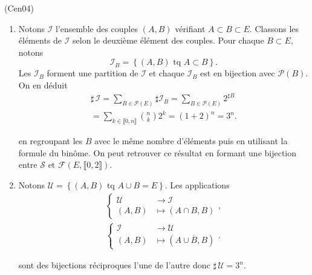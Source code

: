 \begin{tiny}(Cen04)\end{tiny} 
\begin{enumerate}
  \item Notons $\mathcal{I}$ l'ensemble des couples $(A,B)$ vérifiant $A\subset B \subset E$.\newline
Classons les éléments de $\mathcal{I}$ selon le deuxième élément des couples. Pour chaque $B \subset E$, notons
\[
  \mathcal{I}_B =
  \left\lbrace (A,B) \text{ tq } A \subset B \right\rbrace.
\]
Les $\mathcal{I}_B$ forment une partition de $\mathcal{I}$ et chaque $\mathcal{I}_B$ est en bijection avec $\mathcal{P}(B)$. On en déduit
\begin{multline*}
\sharp\, \mathcal{I} =  \sum_{B \in \mathcal{P}(E)} \sharp \mathcal{I}_B
 = \sum_{B \in \mathcal{P}(E)} 2^{\sharp B}\\
 = \sum_{k \in \llbracket 0,n\rrbracket} \binom{n}{k} 2^k 
 = (1+2)^n = 3^n.
\end{multline*}

en regroupant les $B$ avec le même nombre d'éléments puis en utilisant la formule du binôme.\newline
On peut retrouver ce résultat en formant une bijection entre $\mathcal{S}$ et $\mathcal{F}(E,\llbracket 0,2 \rrbracket)$.

  \item Notons $\mathcal{U}= \left\lbrace (A,B) \text{ tq } A\cup B = E\right\rbrace$. Les applications
\begin{multline*}
\left\lbrace
  \begin{aligned}
    \mathcal{U} &\rightarrow \mathcal{I} \\
    (A,B)       &\mapsto (A\cap B, B)
  \end{aligned}
\right., \\
\left\lbrace
  \begin{aligned}
    \mathcal{I} &\rightarrow \mathcal{U} \\
    (A,B) &\mapsto (A \cup \overline{B},B)
  \end{aligned}
\right..
\end{multline*}

sont des bijections réciproques l'une de l'autre donc $\sharp\, \mathcal{U} = 3^n$.
\end{enumerate}

